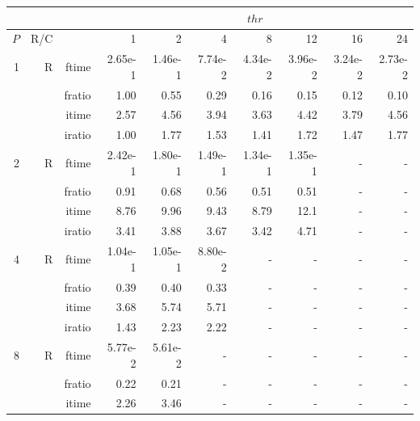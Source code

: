 \documentclass[a4paper]{article}
\begin{document}
\begin{table}[htbp]
\begin{center}
\begin{small}
\begin{tabular}{|r|r|r|r|r|r|r|r|r|r|}
\hline 
     & & & \multicolumn{7}{c|}{$thr$} \\ \hline
    $P$ & R/C &  & 1           & 2    & 4    & 8    & 12   & 16    & 24  \\ \hline\hline
   1 &  R &   ftime &    2.65e-1 &    1.46e-1 &    7.74e-2 &    4.34e-2 &    3.96e-2 &    3.24e-2 &    2.73e-2 \\
             &             &  fratio &    1.00 &    0.55 &    0.29 &    0.16 &    0.15 &    0.12 &    0.10 \\
             &             &  itime &    2.57  &    4.56  &    3.94  &    3.63  &    4.42  &    3.79  &    4.56  \\
             &             &  iratio &    1.00 &    1.77  &    1.53  &    1.41  &    1.72  &    1.47  &    1.77  \\\hline
   2 &  R &   ftime &    2.42e-1 &    1.80e-1 &    1.49e-1 &    1.34e-1 &    1.35e-1 &      - &      - \\
             &             &  fratio &    0.91 &    0.68 &    0.56 &   0.51 &   0.51 &      - &      - \\
             &             &  itime &    8.76  &    9.96  &    9.43  &    8.79  &    12.1 &     - &      - \\
             &             &  iratio &    3.41  &    3.88  &   3.67  &    3.42  &    4.71  &      - &      - \\\hline
   4 &  R &   ftime &    1.04e-1 &    1.05e-1 &    8.80e-2 &      - &      - &      - &      - \\
             &             &  fratio &    0.39 &    0.40 &    0.33 &      - &      - &      - &      - \\
             &             &  itime &    3.68  &    5.74  &    5.71  &      - &      - &      - &      - \\
             &             &  iratio &    1.43  &    2.23  &    2.22  &      - &      - &      - &      - \\\hline
   8 &   R &   ftime &    5.77e-2 &    5.61e-2 &      - &      - &      - &      - &      - \\
             &             &  fratio &   0.22 &    0.21 &      - &      - &      - &      - &      - \\
             &             &  itime &    2.26  &    3.46  &      - &      - &      - &      - &      - \\

\end{tabular}
\end{small}
\end{center}
\end{table}
\end{document}
